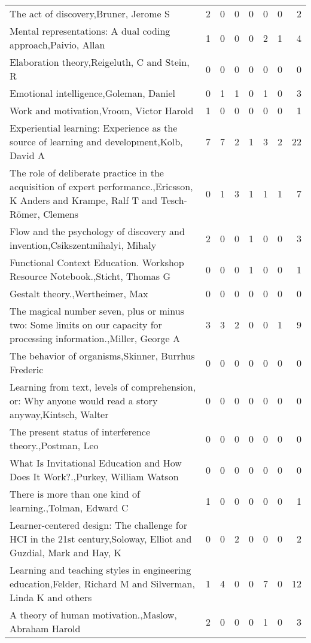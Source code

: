 \begin{table*}[t]
\begin{tabular}{lp{2cm}p{2cm}p{2cm}p{2cm}p{2cm}p{2cm}r}
The act of discovery,Bruner, Jerome S & 2 & 0 & 0 & 0 & 0 & 0 & 2\\
Mental representations: A dual coding approach,Paivio, Allan & 1 & 0 & 0 & 0 & 2 & 1 & 4\\
Elaboration theory,Reigeluth, C and Stein, R & 0 & 0 & 0 & 0 & 0 & 0 & 0\\
Emotional intelligence,Goleman, Daniel & 0 & 1 & 1 & 0 & 1 & 0 & 3\\
Work and motivation,Vroom, Victor Harold & 1 & 0 & 0 & 0 & 0 & 0 & 1\\
Experiential learning: Experience as the source of learning and development,Kolb, David A & 7 & 7 & 2 & 1 & 3 & 2 & 22\\
The role of deliberate practice in the acquisition of expert performance.,Ericsson, K Anders and Krampe, Ralf T and Tesch-R{\"o}mer, Clemens & 0 & 1 & 3 & 1 & 1 & 1 & 7\\
Flow and the psychology of discovery and invention,Csikszentmihalyi, Mihaly & 2 & 0 & 0 & 1 & 0 & 0 & 3\\
Functional Context Education. Workshop Resource Notebook.,Sticht, Thomas G & 0 & 0 & 0 & 1 & 0 & 0 & 1\\
Gestalt theory.,Wertheimer, Max & 0 & 0 & 0 & 0 & 0 & 0 & 0\\
The magical number seven, plus or minus two: Some limits on our capacity for processing information.,Miller, George A & 3 & 3 & 2 & 0 & 0 & 1 & 9\\
The behavior of organisms,Skinner, Burrhus Frederic & 0 & 0 & 0 & 0 & 0 & 0 & 0\\
Learning from text, levels of comprehension, or: Why anyone would read a story anyway,Kintsch, Walter & 0 & 0 & 0 & 0 & 0 & 0 & 0\\
The present status of interference theory.,Postman, Leo & 0 & 0 & 0 & 0 & 0 & 0 & 0\\
What Is Invitational Education and How Does It Work?.,Purkey, William Watson & 0 & 0 & 0 & 0 & 0 & 0 & 0\\
There is more than one kind of learning.,Tolman, Edward C & 1 & 0 & 0 & 0 & 0 & 0 & 1\\
Learner-centered design: The challenge for HCI in the 21st century,Soloway, Elliot and Guzdial, Mark and Hay, K & 0 & 0 & 2 & 0 & 0 & 0 & 2\\
Learning and teaching styles in engineering education,Felder, Richard M and Silverman, Linda K and others & 1 & 4 & 0 & 0 & 7 & 0 & 12\\
A theory of human motivation.,Maslow, Abraham Harold & 2 & 0 & 0 & 0 & 1 & 0 & 3\\

\end{tabular}
\end{table*}
